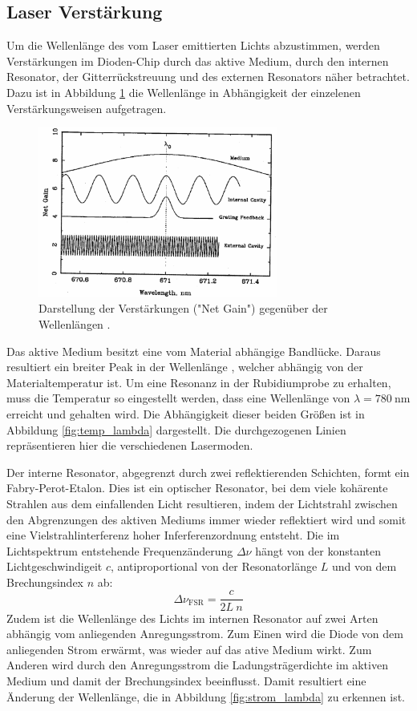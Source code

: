 \subsection{Laser Verstärkung}
Um die Wellenlänge des vom Laser emittierten Lichts abzustimmen, werden Verstärkungen im
Dioden-Chip durch das aktive Medium, durch den internen Resonator, der Gitterrückstreuung
und des externen Resonators näher betrachtet. Dazu ist in Abbildung \ref{fig:net_gain}
die Wellenlänge in Abhängigkeit der einzelenen Verstärkungsweisen aufgetragen.
\begin{figure}[htb]
  \centering
  \includegraphics[width=0.7\textwidth, angle=1, origin=c]{images/gain-lambda.pdf}
  \caption{Darstellung der Verstärkungen ("Net Gain") gegenüber der Wellenlängen
  \cite{anleitung}.}
  \label{fig:net_gain}
\end{figure}

Das aktive Medium besitzt eine vom Material abhängige Bandlücke. Daraus resultiert
ein breiter Peak in der Wellenlänge \lambda, welcher abhängig von der
Materialtemperatur ist. Um eine Resonanz in der Rubidiumprobe zu erhalten, muss
die Temperatur so eingestellt werden, dass eine Wellenlänge von $\lambda = \SI{780}{\nano\meter}$
erreicht und gehalten wird. Die Abhängigkeit dieser beiden Größen ist in Abbildung
\ref{fig:temp_lambda} dargestellt. Die durchgezogenen Linien repräsentieren hier
die verschiedenen Lasermoden.

Der interne Resonator, abgegrenzt durch zwei reflektierenden Schichten, formt ein
Fabry-Perot-Etalon. Dies ist ein optischer Resonator, bei dem viele kohärente Strahlen
aus dem einfallenden Licht resultieren, indem der Lichtstrahl zwischen den
Abgrenzungen des aktiven Mediums immer wieder reflektiert wird und somit eine
Vielstrahlinterferenz hoher Inferferenzordnung entsteht. Die im Lichtspektrum
entstehende Frequenzänderung $\Delta\nu$ hängt von der konstanten Lichtgeschwindigeit $c$,
antiproportional von der Resonatorlänge $L$ und von dem Brechungsindex $n$ ab:
\begin{equation}
  \Delta\nu_\text{FSR} = \frac{c}{2L\:n}
\end{equation}
Zudem ist die Wellenlänge des Lichts im internen Resonator auf zwei Arten abhängig
vom anliegenden Anregungsstrom. Zum Einen wird die Diode von dem anliegenden Strom
erwärmt, was wieder auf das ative Medium wirkt. Zum Anderen wird durch den Anregungsstrom
die Ladungsträgerdichte im aktiven Medium und damit der Brechungsindex beeinflusst.
Damit resultiert eine Änderung der Wellenlänge, die in Abbildung \ref{fig:strom_lambda}
zu erkennen ist.

